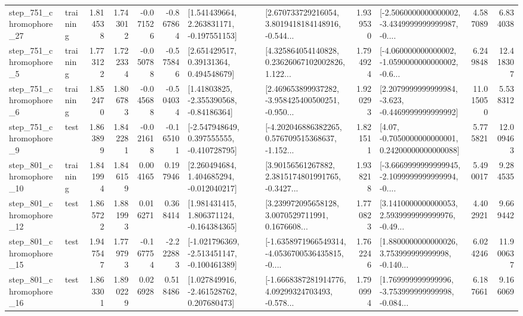 \begin{tabular}{llrrrrllrlrr}
  step\_751\_chromophore\_27 &  training &      1.814538 &    1.743012 &     -0.071526 & -0.867864 &    [1.541439664, 2.263831171, -0.197551153] &  [2.670733729216054, 3.8019418184148916, -0.544... &       1.939530 &  [-2.5060000000000002, -3.4349999999999987, -0.... &            4.587089 &          6.834038 \\
   step\_751\_chromophore\_5 &  training &      1.773122 &    1.722334 &     -0.050788 & -0.575846 &      [2.651429517, 0.39131364, 0.494548679] &  [4.325864054140828, 0.23626067102002826, 1.122... &       1.794924 &  [-4.060000000000002, -1.0590000000000002, -0.6... &            6.249848 &         12.418307 \\
   step\_751\_chromophore\_6 &  training &      1.852470 &    1.806783 &     -0.045688 & -0.504034 &     [1.41803825, -2.355390568, -0.84186364] &  [2.469653899937282, -3.958425400500251, -0.950... &       1.920293 &  [2.2079999999999984, -3.623, -0.4469999999999992] &           11.015050 &          5.538312 \\
   step\_751\_chromophore\_9 &      test &      1.863899 &    1.842281 &     -0.021618 & -0.165101 &   [-2.547948649, 0.397555555, -0.410728795] &  [-4.202046886382265, 0.576709515368637, -1.152... &       1.821511 &   [4.07, -0.7050000000000001, 0.24200000000000088] &            5.775821 &         12.009463 \\
  step\_801\_chromophore\_10 &  training &      1.841994 &    1.846159 &      0.004165 &  0.197946 &    [2.260494684, 1.404685294, -0.012040217] &  [3.90156561267882, 2.3815174801991765, -0.3427... &       1.938218 &  [-3.6669999999999945, -2.1099999999999994, -0.... &            5.490017 &          9.284535 \\
  step\_801\_chromophore\_12 &      test &      1.865722 &    1.881993 &      0.016271 &  0.368414 &    [1.981431415, 1.806371124, -0.164384365] &  [3.239972095658128, 3.0070529711991, 0.1676608... &       1.770823 &  [3.1410000000000053, 2.5939999999999976, -0.49... &            4.402921 &          9.669442 \\
  step\_801\_chromophore\_15 &      test &      1.947547 &    1.779793 &     -0.167754 & -2.222883 &  [-1.021796369, -2.513451147, -0.100461389] &  [-1.6358971966549314, -4.0536700536435815, -0.... &       1.762246 &  [1.8800000000000026, 3.753999999999998, -0.140... &            6.024246 &         11.900637 \\
  step\_801\_chromophore\_16 &      test &      1.863301 &    1.890229 &      0.026928 &  0.518486 &    [1.027849916, -2.461528762, 0.207680473] &  [-1.6668387281914776, 4.09299324703493, -0.578... &       1.790994 &  [1.769999999999996, -3.753999999999998, -0.084... &            6.187661 &          9.166069 \\

\end{tabular}
